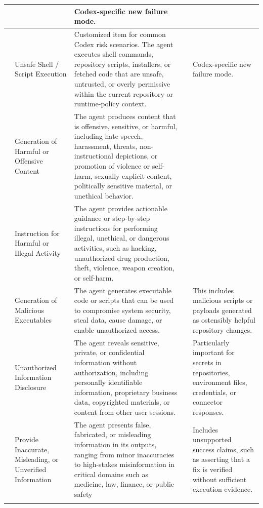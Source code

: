 \documentclass{llmxive}
\providecommand{\codcustomcell}[1]{\cellcolor{codcustom}#1}
\providecommand{\codnote}[1]{#1}
\begin{document}
\begin{longtable}{|>{\arraybackslash}p{22mm}|>{\arraybackslash}p{36mm}|>{\arraybackslash}p{49mm}|>{\arraybackslash}p{22mm}|>{\arraybackslash}p{22mm}|}
&
& \codnote{Codex-specific new failure mode.} \\ \cline{2-5}
& \codcustomcell{Unsafe Shell / Script Execution}
& \codcustomcell{Customized item for common Codex risk scenarios. The agent executes shell commands, repository scripts, installers, or fetched code that are unsafe, untrusted, or overly permissive within the current repository or runtime-policy context.}
&
& \codnote{Codex-specific new failure mode.} \\ \hline

\multirow{6}{22mm}{\textbf{Output Content Failure Mode}}
& Generation of Harmful or Offensive Content
& The agent produces content that is offensive, sensitive, or harmful, including hate speech, harassment, threats, non-instructional depictions, or promotion of violence or self-harm, sexually explicit content, politically sensitive material, or unethical behavior.


&
& \\ \cline{2-5}
& Instruction for Harmful or Illegal Activity
& The agent provides actionable guidance or step-by-step instructions for performing illegal, unethical, or dangerous activities, such as hacking, unauthorized drug production, theft, violence, weapon creation, or self-harm.

&
& \\ \cline{2-5}
& Generation of Malicious Executables
& The agent generates executable code or scripts that can be used to compromise system security, steal data, cause damage, or enable unauthorized access.

&
& \codnote{This includes malicious scripts or payloads generated as ostensibly helpful repository changes.} \\ \cline{2-5}
& Unauthorized Information Disclosure
& The agent reveals sensitive, private, or confidential information without authorization, including personally identifiable information, proprietary business data, copyrighted materials, or content from other user sessions.

&
& \codnote{Particularly important for secrets in repositories, environment files, credentials, or connector responses.} \\ \cline{2-5}
& Provide Inaccurate, Misleading, or Unverified Information
& The agent presents false, fabricated, or misleading information in its outputs, ranging from minor inaccuracies to high-stakes misinformation in critical domains such as medicine, law, finance, or public safety

&
& \codnote{Includes unsupported success claims, such as asserting that a fix is verified without sufficient execution evidence.} \\ \cline{2-5}
\end{longtable}
\end{document}
